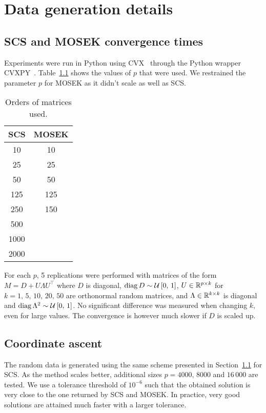 \chapter{Data generation details}\label{ch:appendix_data}

\section{SCS and MOSEK convergence times}\label{sec:cvx_times}

Experiments were run in Python using CVX~\citep{cvx} through the Python wrapper CVXPY~\citep{cvxpy}.
Table~\ref{tab:cvx_times_ps} shows the values of $p$ that were used.
We restrained the parameter $p$ for MOSEK as it didn't scale as well as SCS\@.
\begin{table}[!htb]
    \centering
    \setlength{\tabcolsep}{2pt}
    {\small
        \begin{tabular}{|c|c|}\hline
        \textbf{SCS} & \textbf{MOSEK}\\ \hline
        10 & 10\\ \hline
        25 & 25\\ \hline
        50 & 50\\ \hline
        125 & 125\\ \hline
        250 & 150\\ \hline
        500 &\\ \hline
        1000 &\\ \hline
        2000 &\\ \hline
        \end{tabular}
    }%
    \caption[short]{
        Orders of matrices used.
    }
    \label{tab:cvx_times_ps}
\end{table}
For each $p$, 5 replications were performed with matrices of the form $M = D + U \Lambda U^\top$ where $D$ is diagonal,
$\operatorname*{diag} D \sim \mathcal{U}\left[ 0,\, 1 \right]$, $U \in \mathbb{R}^{p \times k}$ for $k = 1,\, 5,\, 10,\, 20,\, 50$
are orthonormal random matrices, and $\Lambda \in \mathbb{R}^{k \times k}$ is diagonal and
$\operatorname*{diag} \Lambda^2 \sim \mathcal{U}\left[ 0,\, 1 \right]$.
No significant difference was measured when changing $k$, even for large values.
The convergence is however much slower if $D$ is scaled up.

\section{Coordinate ascent}\label{sec:coordinate_ascent_data}

The random data is generated using the same scheme presented in Section~\ref{sec:cvx_times} for SCS\@.
As the method scales better, additional sizes $p = 4000,\, 8000$ and $16\,000$ are tested.
We use a tolerance threshold of $10^{-6}$
such that the obtained solution is very close to the one returned by SCS and MOSEK\@.
In practice, very good solutions are attained much faster with a larger tolerance.
